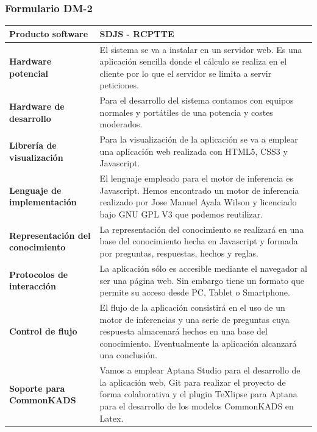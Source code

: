 \documentclass[a4paper,11pt]{article}
\begin{document}
			\subsubsection{Formulario DM-2}
			\begin{center}
				\begin{tabular}{| p{4.8cm} | p{6.5cm} |}
					\hline
					\textbf{Producto software} & SDJS - RCPTTE \\
					\hline
					\textbf{Hardware potencial} & El sistema se va a instalar en un servidor
					web. Es una aplicación sencilla donde el cálculo se realiza en el cliente por lo que el servidor se limita a servir peticiones.\\
					\hline
					\textbf{Hardware de desarrollo} & Para el desarrollo del sistema contamos
					con equipos normales y portátiles de una potencia y costes moderados.\\
					\hline
					\textbf{Librería de visualización} & Para la visualización de la aplicación
					se va a emplear una aplicación web realizada con HTML5, CSS3 y Javascript.\\
					\hline
					\textbf{Lenguaje de implementación} & El lenguaje empleado para el motor de
					inferencia es Javascript. Hemos encontrado un motor de inferencia realizado por Jose Manuel Ayala Wilson y licenciado bajo GNU GPL V3 que podemos reutilizar.\\
					\hline
					\textbf{Representación del conocimiento} & La representación del
					conocimiento se realizará en una base del conocimiento hecha en Javascript y formada por preguntas, respuestas, hechos y reglas.\\
					\hline
					\textbf{Protocolos de interacción} & La aplicación sólo es accesible
					mediante el navegador al ser una página web. Sin embargo tiene un formato que permite su acceso desde PC, Tablet o Smartphone.\\
					\hline
					\textbf{Control de flujo} & El flujo de la aplicación consistirá en el uso
					de un motor de inferencias y una serie de preguntas cuya respuesta almacenará hechos en una base del conocimiento. Eventualmente la aplicación alcanzará una conclusión.\\
					\hline
					\textbf{Soporte para CommonKADS} & Vamos a emplear Aptana Studio para el
					desarrollo de la aplicación web, Git para realizar el proyecto de forma colaborativa y el plugin TeXlipse para Aptana para el desarrollo de los modelos CommonKADS en Latex.\\
					\hline
				\end{tabular}
			\end{center}
\end{document}
